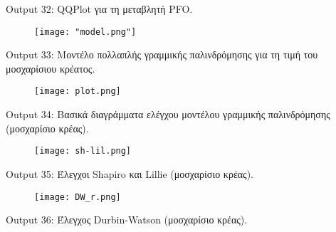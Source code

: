 \documentclass[10pt]{article}
\begin{document}
\begin{centering}


\renewcommand{\caption}{Output 32: }
\caption { QQPlot για τη μεταβλητή PFO. }
\end{centering}

\begin{figure}[H]
    \centering
    \texttt{[image: "model.png"]}
    
    \label{fig:galaxy}
\end{figure}

\begin{centering}


\renewcommand{\caption}{Output 33: }
\caption { Μοντέλο πολλαπλής γραμμικής παλινδρόμησης για τη τιμή του μοσχαρίσιου κρέατος. }
\end{centering}

\begin{figure}[H]
    \centering
    \texttt{[image: plot.png]}
    
    \label{fig:galaxy}
\end{figure}

\begin{centering}


\renewcommand{\caption}{Output 34: }
\caption { Βασικά διαγράμματα ελέγχου μοντέλου γραμμικής παλινδρόμησης (μοσχαρίσιο κρέας). }
\end{centering}

\begin{figure}[H]
    \centering
    \texttt{[image: sh-lil.png]}
    
    \label{fig:galaxy}
\end{figure}

\begin{centering}


\renewcommand{\caption}{Output 35: }
\caption { Έλεγχοι Shapiro και Lillie (μοσχαρίσιο κρέας). }
\end{centering}

\begin{figure}[H]
    \centering
    \texttt{[image: DW\_r.png]}
    
    \label{fig:galaxy}
\end{figure}

\begin{centering}


\renewcommand{\caption}{Output 36: }
\caption { Έλεγχος Durbin-Watson (μοσχαρίσιο κρέας). }
\end{centering}
\end{document}
